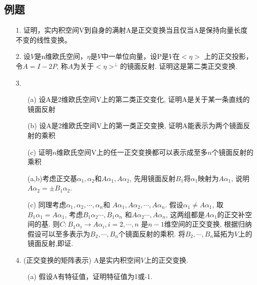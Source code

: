 \subsection{例题}
\begin{itemize}
    \item[1.] 证明，实内积空间V到自身的满射A是正交变换当且仅当A是保持向量长度不变的线性变换。
    \item[2.] 设$V$是n维欧氏空间，$\eta$是$V$中一单位向量，设P是$V$在$<\eta>$
    上的正交投影，令$A=I-2P$, 称$A$为关于$<\eta>^{\perp}$的镜面反射. 证明这是第二类正交变换. 
    \item[3.] 
    \begin{itemize}
        \item [(a)] 设A是2维欧氏空间V上的第二类正交变化, 证明A是关于某一条直线的镜面反射
        \item [(b)] 设A是2维欧氏空间V上的第一类正交变换, 证明A能表示为两个镜面反射的乘积
        \item [(c)] 证明$n$维欧氏空间V上的任一正交变换都可以表示成至多$n$个镜面反射的乘积
        
        \begin{solution}
            (a,b)考虑正交基$\alpha_1, \alpha_2$和$A \alpha_1, A \alpha_2$,
            先用镜面反射$B_1$将$\alpha_1$映射为$A\alpha_1$, 说明$A\alpha_2 = \pm B_1\alpha_2$.
            
            (c) 同理考虑$\alpha_1, \alpha_2,\cdots, \alpha_n$和
            $A\alpha_1, A\alpha_2,\cdots, A\alpha_n$. 假设$\alpha_1 \ne A\alpha_1$,
            取$B_1 \alpha_1 = A\alpha_1$, 考虑$B_1 \alpha_2 \cdots, B_1\alpha_n$
            和$A \alpha_2 \cdots, A\alpha_n$, 这两组都是$A \alpha_1$的正交补空间的基.
            则$C: B_1\alpha_i \rightarrow A\alpha_i, i=2,\cdots, n$
            是$n-1$维空间的正交变换, 根据归纳假设可以至多表示为$B_2,\cdots, B_n$个镜面反射的乘积.
            将$B_2,\cdots, B_n$延拓为$V$上的镜面反射,即证.
        \end{solution}
    \end{itemize}
    

    \item[4.] (正交变换的矩阵表示) A是实内积空间$V$上的正交变换.
    \begin{itemize}
        \item [(a)] 假设A有特征值，证明特征值为1或-1.
        

\end{itemize}
\end{itemize}

